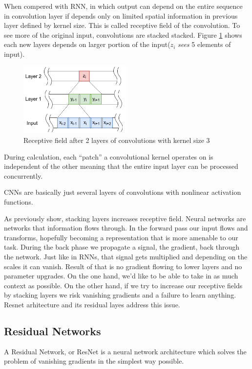 \documentclass[times, utf8, diplomski, numeric, english]{fer}
\begin{document}
When compered with RNN, in which output can depend on the entire sequence in convolution layer if depends only on limited spatial information in previous layer defined by kernel size. This is called receptive field of the convolution. 
To see more of the original input, convolutions are stacked stacked. Figure \ref{fg:receptive field} shows each new layers depends on larger portion of the input($z_i$ \textit{sees} 5 elements of input).
\begin{figure}[!ht]
	\begin{center}
		\includegraphics[width=0.5\textwidth]{./imgs/receptive_field.png}
		\caption{Receptive field after 2 layers of convolutions with kernel size 3}
		\label{fg:receptive field}
	\end{center}
\end{figure}

During calculation, each “patch” a convolutional kernel operates on is independent of the other meaning that the entire input layer can be processed concurrently. 

CNNs are basically just several layers of convolutions with nonlinear activation functions.


As previously show, stacking layers increases receptive field. 
Neural networks are networks that information flows through. In the forward pass our input flows and transforms, hopefully becoming a representation that is more amenable to our task. During the back phase we propagate a signal, the gradient, back through the network. Just like in RNNs, that signal gets multiplied and depending on the scales it can vanish. Result of that is no gradient flowing to lower layers and no parameter upgrades. On the one hand, we’d like to be able to take in as much context as possible. On the other hand, if we try to increase our receptive fields by stacking layers we risk vanishing gradients and a failure to learn anything. Resnet arhitecture\cite{resnet} and its residual layes address this issue.

\subsection{Residual Networks}
A Residual Network, or ResNet is a neural network architecture which solves the problem of vanishing gradients in the simplest way possible. 
\end{document}
